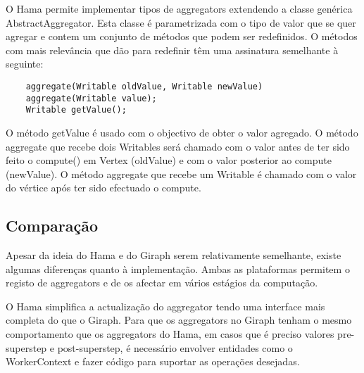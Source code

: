     O Hama permite implementar tipos de aggregators extendendo a classe genérica AbstractAggregator.
    Esta classe é parametrizada com o tipo de valor que se quer agregar e contem um conjunto de métodos que podem ser redefinidos.
    O métodos com mais relevância que dão para redefinir têm uma assinatura semelhante à seguinte:
    \begin{lstlisting}
    aggregate(Writable oldValue, Writable newValue)			  
    aggregate(Writable value);
    Writable getValue();
    \end{lstlisting}
    O método getValue é usado com o objectivo de obter o valor agregado. 
    O método aggregate que recebe dois Writables será chamado com o valor antes de ter sido feito o compute() em Vertex (oldValue) e com
    o valor posterior ao compute (newValue). O método aggregate que recebe um Writable é chamado com o valor do vértice após ter sido efectuado
    o compute. 

  \subsection*{Comparação}
  
  Apesar da ideia do Hama e do Giraph serem relativamente semelhante, existe algumas diferenças quanto à implementação. Ambas as plataformas
  permitem o registo de aggregators e de os afectar em vários estágios da computação. 
  
  O Hama simplifica a actualização do aggregator tendo uma interface mais completa do que o Giraph. Para que os aggregators no Giraph tenham o 
  mesmo comportamento que os aggregators do Hama, em casos que é preciso valores pre-superstep e post-superstep, é necessário envolver 
  entidades como o WorkerContext e fazer código para suportar as operações desejadas.
  
